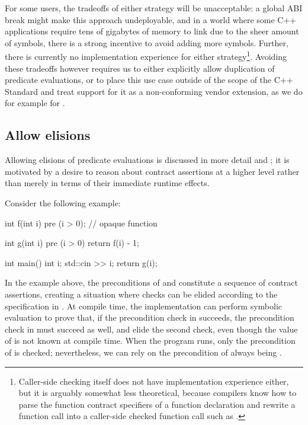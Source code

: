 For some users, the tradeoffs of either strategy will be unacceptable: a global ABI break might make this approach undeployable, and in a world where some C++ applications require tens of gigabytes of memory to link due to the sheer amount of symbols, there is a strong incentive to avoid adding more symbols. Further, there is currently no implementation experience for either strategy\footnote{Caller-side checking itself does not have implementation experience either, but it is arguably somewhat less theoretical, because compilers know how to parse the function contract specifiers of a function declaration and rewrite a function call  into a caller-side checked function call such as \mbox{}.}. Avoiding these tradeoffs however requires us to either explicitly allow duplication of predicate evaluations, or to place this use case outside of the scope of the C++ Standard and treat support for it as a non-conforming vendor extension, as we do for example for .

\subsection{Allow elisions}
\label{subsec:elisions}

Allowing elisions of predicate evaluations is discussed in more detail \cite{P1670R0} and \cite{P2751R1}; it is motivated by a desire to reason about contract assertions at a higher level rather than merely in terms of their immediate runtime effects.

Consider the following example:
\begin{codeblock}
int f(int i)
  pre (i > 0);  // opaque function
  
int g(int i)
  pre (i > 0) {
  return f(i) - 1;
}

int main() {
  int i;
  std::cin >> i;
  return g(i);
}
\end{codeblock}
In the example above, the preconditions of  and  constitute a sequence of contract assertions, creating a situation where checks can be elided according to the specification in \cite{P2900R6}. At compile time, the implementation can perform symbolic evaluation to prove that, if the precondition check in  succeeds, the precondition check in  must succeed as well, and elide the second check, even though the value of  is not known at compile time. When the program runs, only the precondition of  is checked; nevertheless, we can rely on the precondition of  always being .

